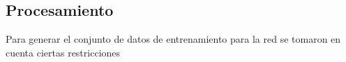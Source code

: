 \subsection{Procesamiento}

Para generar el conjunto de datos de entrenamiento para la red se tomaron en cuenta ciertas restricciones 